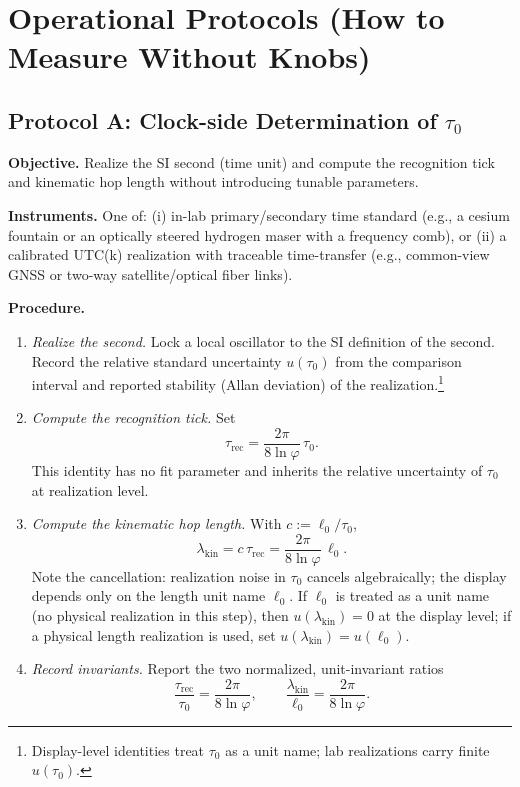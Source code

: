 \documentclass[11pt]{article}
\begin{document}
\section{Operational Protocols (How to Measure Without Knobs)}

\subsection*{Protocol A: Clock-side Determination of \(\tau_{0}\)}
\textbf{Objective.} Realize the SI second (time unit) and compute the recognition tick and kinematic hop length without introducing tunable parameters.

\textbf{Instruments.} One of:
(i) in-lab primary/secondary time standard (e.g., a cesium fountain or an optically steered hydrogen maser with a frequency comb), or
(ii) a calibrated UTC(k) realization with traceable time-transfer (e.g., common-view GNSS or two-way satellite/optical fiber links).

\textbf{Procedure.}
\begin{enumerate}
  \item \emph{Realize the second.} Lock a local oscillator to the SI definition of the second. Record the relative standard uncertainty \(u(\tau_{0})\) from the comparison interval and reported stability (Allan deviation) of the realization.\footnote{Display-level identities treat \(\tau_{0}\) as a unit name; lab realizations carry finite \(u(\tau_{0})\).}
  \item \emph{Compute the recognition tick.} Set
  \[
  \tau_{\mathrm{rec}}=\frac{2\pi}{8\ln\varphi}\,\tau_{0}.
  \]
  This identity has no fit parameter and inherits the relative uncertainty of \(\tau_{0}\) at realization level.
  \item \emph{Compute the kinematic hop length.} With \(c:=\ell_{0}/\tau_{0}\),
  \[
  \lambda_{\mathrm{kin}}=c\,\tau_{\mathrm{rec}}=\frac{2\pi}{8\ln\varphi}\,\ell_{0}.
  \]
  Note the cancellation: realization noise in \(\tau_{0}\) cancels algebraically; the display depends only on the length unit name \(\ell_{0}\). If \(\ell_{0}\) is treated as a unit name (no physical realization in this step), then \(u(\lambda_{\mathrm{kin}})=0\) at the display level; if a physical length realization is used, set \(u(\lambda_{\mathrm{kin}})=u(\ell_{0})\).
  \item \emph{Record invariants.} Report the two normalized, unit-invariant ratios
  \[
  \frac{\tau_{\mathrm{rec}}}{\tau_{0}}=\frac{2\pi}{8\ln\varphi},\qquad
  \frac{\lambda_{\mathrm{kin}}}{\ell_{0}}=\frac{2\pi}{8\ln\varphi}.
  \]
\end{enumerate}
\end{document}
